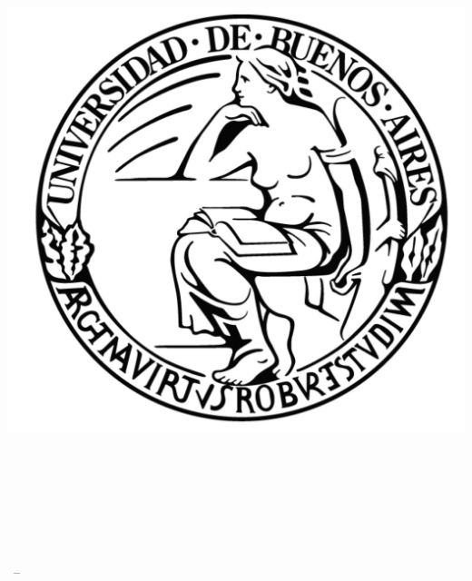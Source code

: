 \begin{titlepage}
    \begin{addmargin}[-1cm]{-3cm}
    \begin{center}
    	
    	\includegraphics[scale=.3]{gfx/uba.jpg}
    	
        \large

        \hfill

        \vfill

        \begingroup
            \color{Maroon}\spacedallcaps{\myTitle} \\ \bigskip
            \color{NavyBlue}\spacedallcaps{\mySubtitle} \\ \bigskip
        \endgroup

        \vfill

		\myUni \\ \bigskip
		\myFaculty \\
        \myDepartment \\ \medskip
        \myDegree
        \myDirector

        \myTime\ -- \myVersion

        \vfill

    \end{center}
  \end{addmargin}
\end{titlepage}
